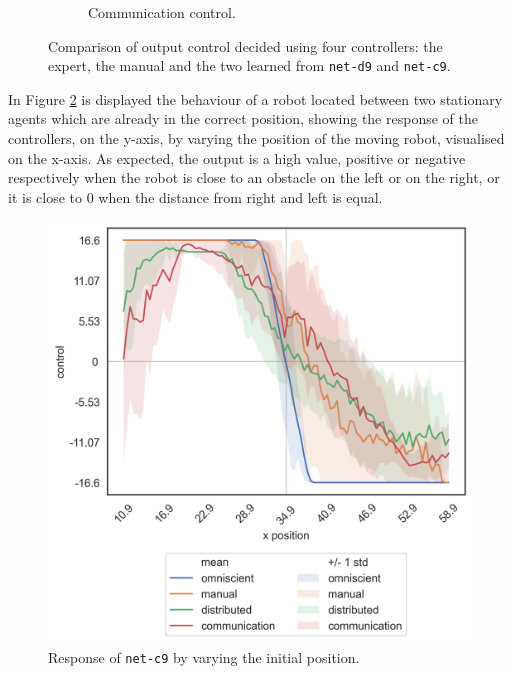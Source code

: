 \begin{figure}[!htb]
\begin{center}
\begin{subfigure}[h]{0.35\textwidth}
			\caption{Communication control.}
		\end{subfigure}
	\end{center}
	\vspace{-0.5cm}
	\caption[Evaluation of the control decided by \texttt{net-c9}.]{Comparison of 
	output control decided using four controllers: the expert, the manual and the 
	two learned from \texttt{net-d9} and \texttt{net-c9}.}
	\label{fig:net-c9control}
\end{figure}

In Figure \ref{fig:net-c9responseposition} is displayed the behaviour of a robot 
located between two stationary agents which are already in the correct position, 
showing the response of the controllers, on the y-axis, by varying the position of 
the moving robot, visualised on the x-axis. As expected, the output is a high 
value, positive or negative respectively when the robot is close to an obstacle on 
the left or on the right, or it is close to $0$ when the distance from right and left 
is equal.
\begin{figure}[!htb]
	\centering
	\includegraphics[width=.5\textwidth]{contents/images/net-c9/response-varying_init_position-communication}%
	\caption{Response of \texttt{net-c9} by varying the initial position.}
	\label{fig:net-c9responseposition}
\end{figure}

